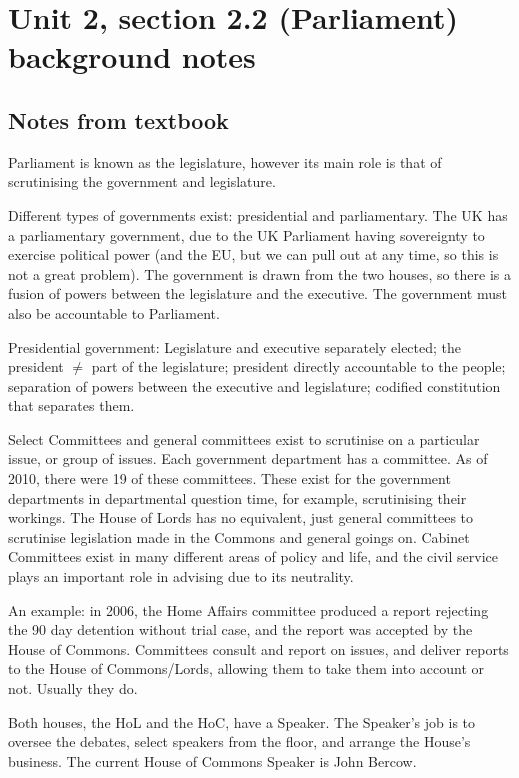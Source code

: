 \documentclass[12pt]{article}
\begin{document}
\section*{Unit 2, section 2.2 (Parliament) background notes}

\subsection*{Notes from textbook}

Parliament is known as the legislature, however its main role is that of scrutinising the government and legislature.

Different types of governments exist: presidential and parliamentary.  The UK has a parliamentary government, due to the UK Parliament having sovereignty to exercise political power (and the EU, but we can pull out at any time, so this is not a great problem).  The government is drawn from the two houses, so there is a fusion of powers between the legislature and the executive.  The government must also be accountable to Parliament.

Presidential government: Legislature and executive separately elected; the president $\neq$ part of the legislature; president directly accountable to the people; separation of powers between the executive and legislature; codified constitution that separates them.

Select Committees and general committees exist to scrutinise on a particular issue, or group of issues.  Each government department has a committee.  As of 2010, there were 19 of these committees.  These exist for the government departments in departmental question time, for example, scrutinising their workings.  The House of Lords has no equivalent, just general committees to scrutinise legislation made in the Commons and general goings on.  Cabinet Committees exist in many different areas of policy and life, and the civil service plays an important role in advising due to its neutrality.

An example: in 2006, the Home Affairs committee produced a report rejecting the 90 day detention without trial case, and the report was accepted by the House of Commons.  Committees consult and report on issues, and deliver reports to the House of Commons\slash Lords, allowing them to take them into account or not.  Usually they do.

Both houses, the HoL and the HoC, have a Speaker.  The Speaker's job is to oversee the debates, select speakers from the floor, and arrange the House's business.  The current House of Commons Speaker is John Bercow.
\end{document}
